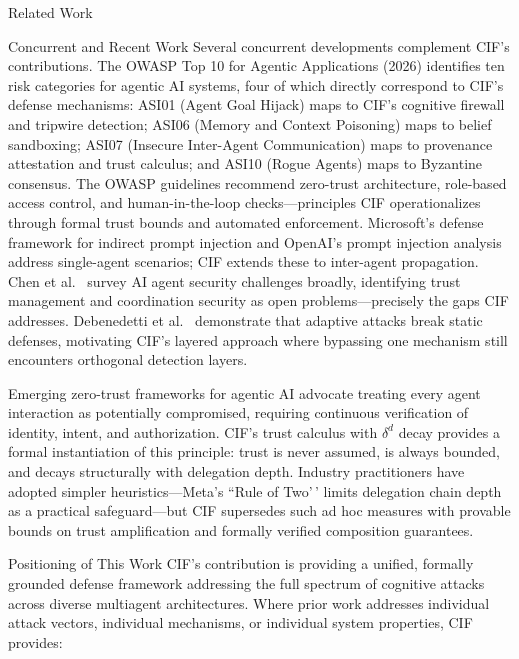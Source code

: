 \documentclass[
  ignorenonframetext,
]{beamer}
\begin{document}
\begin{frame}{Related Work}
\begin{block}{Concurrent and Recent Work}
\protect{}\label{concurrent-and-recent-work}
Several concurrent developments complement CIF's contributions. The
OWASP Top 10 for Agentic Applications (2026) \cite{owasp2025agentic}
identifies ten risk categories for agentic AI systems, four of which
directly correspond to CIF's defense mechanisms: ASI01 (Agent Goal
Hijack) maps to CIF's cognitive firewall and tripwire detection; ASI06
(Memory and Context Poisoning) maps to belief sandboxing; ASI07
(Insecure Inter-Agent Communication) maps to provenance attestation and
trust calculus; and ASI10 (Rogue Agents) maps to Byzantine consensus.
The OWASP guidelines recommend zero-trust architecture, role-based
access control, and human-in-the-loop checks---principles CIF
operationalizes through formal trust bounds and automated enforcement.
Microsoft's defense framework for indirect prompt injection
\cite{microsoft2025indirect} and OpenAI's prompt injection analysis
\cite{openai2025promptinjection} address single-agent scenarios; CIF
extends these to inter-agent propagation. Chen et
al.~\cite{aiagentssurvey2025} survey AI agent security challenges
broadly, identifying trust management and coordination security as open
problems---precisely the gaps CIF addresses. Debenedetti et
al.~\cite{adaptive2025attacks} demonstrate that adaptive attacks break
static defenses, motivating CIF's layered approach where bypassing one
mechanism still encounters orthogonal detection layers.

Emerging zero-trust frameworks for agentic AI \cite{zerotrustagents2025}
advocate treating every agent interaction as potentially compromised,
requiring continuous verification of identity, intent, and
authorization. CIF's trust calculus with \(\delta^d\) decay provides a
formal instantiation of this principle: trust is never assumed, is
always bounded, and decays structurally with delegation depth. Industry
practitioners have adopted simpler heuristics---Meta's ``Rule of Two'\,'
limits delegation chain depth as a practical safeguard---but CIF
supersedes such ad hoc measures with provable bounds on trust
amplification and formally verified composition guarantees.
\end{block}

\begin{block}{Positioning of This Work}
\protect{}\label{positioning-of-this-work}
CIF's contribution is providing a unified, formally grounded defense
framework addressing the full spectrum of cognitive attacks across
diverse multiagent architectures. Where prior work addresses individual
attack vectors, individual mechanisms, or individual system properties,
CIF provides:


\end{block}
\end{frame}
\end{document}
